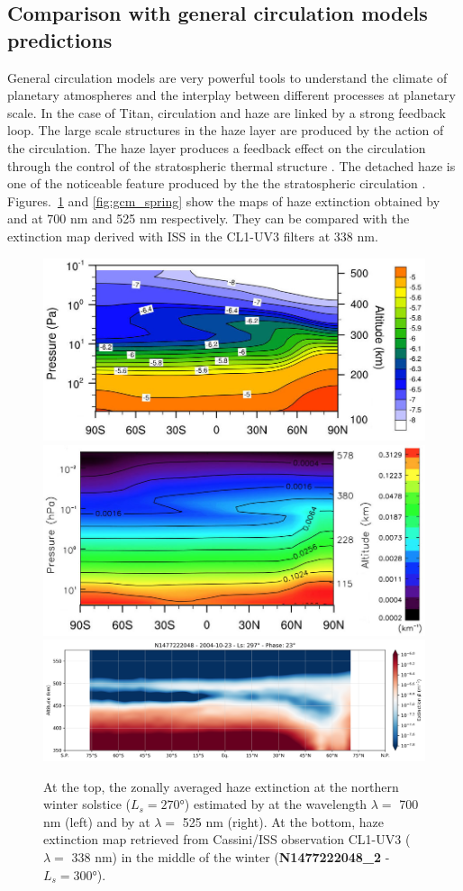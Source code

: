 \subsection{Comparison with general circulation models predictions}

General circulation models are very powerful tools to understand the climate of planetary atmospheres and the
interplay between different processes at planetary scale. In the case of Titan, circulation and haze are linked
by a strong feedback loop. The large scale structures in the haze layer are produced by the action of the
circulation. The haze layer produces a feedback effect on the circulation through the control of the stratospheric
thermal structure \citep{Rannou2004}. The detached haze is one of the noticeable feature produced by the the
stratospheric circulation \citep{Rannou2002, Lebonnois2012, Larson2015}. Figures.~\ref{fig:gcm_winter}
and \ref{fig:gcm_spring} show the maps of haze extinction obtained by \cite{Lebonnois2012} and
\cite{Larson2015} at 700 nm and 525 nm respectively. They can be compared with the extinction map derived
with ISS in the CL1-UV3 filters at 338 nm.

\begin{figure}[!ht]
    \centering
    \includegraphics[width=.4\textwidth]{Fig/Lebonnois2012_Fig4_winter.jpg}
    \includegraphics[width=.4\textwidth]{Fig/Larson2015-Fig7_Winter.jpg}
    \includegraphics[width=.8\textwidth]{Fig/N1477222048_2-lat_beta.png}
    \caption{At the top, the zonally averaged haze extinction at the northern winter solstice
        ($L_s = \ang{270}$) estimated by \cite{Lebonnois2012} at the wavelength $\lambda = $ 700 nm (left)
        and by \cite{Larson2015} at $\lambda = $ 525 nm (right). At the bottom, haze extinction map
        retrieved from Cassini/ISS observation CL1-UV3 ($\lambda = $ 338 nm) in the middle of the winter
        (\textbf{N1477222048\_2} - $L_s = \ang{300}$).}
    \label{fig:gcm_winter}
\end{figure}

